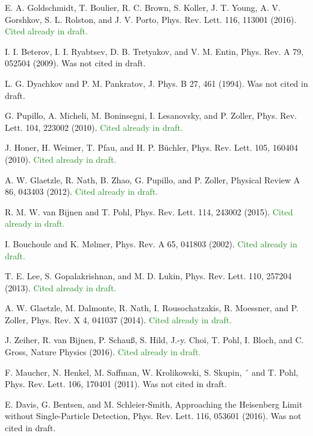 \documentclass[10pt,twocolumn]{article}
\begin{document}
\begin{thebibliography}{8}
E. A. Goldschmidt, T. Boulier, R. C. Brown, S. Koller, J. T. Young, A. V. Gorshkov, S. L. Rolston, and J. V. Porto, Phys. Rev. Lett. 116, 113001 (2016). \textcolor{ForestGreen}{Cited already in draft.}
 
I. I. Beterov, I. I. Ryabtsev, D. B. Tretyakov, and V. M. Entin,
Phys. Rev. A 79, 052504 (2009). \textcolor{RedOrange}{Was not cited in draft.}


L. G. Dyachkov and P. M. Pankratov, J. Phys. B 27, 461
(1994). \textcolor{RedOrange}{Was not cited in draft.}


 G. Pupillo, A. Micheli, M. Boninsegni, I. Lesanovsky, and
P. Zoller, Phys. Rev. Lett. 104, 223002 (2010). \textcolor{ForestGreen}{Cited already in draft.}

 J. Honer, H. Weimer, T. Pfau, and H. P. B\"uchler, Phys. Rev. Lett. 105, 160404 (2010). \textcolor{ForestGreen}{Cited already in draft.}

 A. W. Glaetzle, R. Nath, B. Zhao, G. Pupillo, and P. Zoller, Physical Review A 86, 043403 (2012). \textcolor{ForestGreen}{Cited already in draft.}

 R. M. W. van Bijnen and T. Pohl, Phys. Rev. Lett. 114,
243002 (2015). \textcolor{ForestGreen}{Cited already in draft.}

 I. Bouchoule and K. M{\o}lmer, Phys. Rev. A 65, 041803
(2002). \textcolor{ForestGreen}{Cited already in draft.}

 T. E. Lee, S. Gopalakrishnan, and M. D. Lukin, Phys. Rev.
Lett. 110, 257204 (2013). \textcolor{ForestGreen}{Cited already in draft.}

  A. W. Glaetzle, M. Dalmonte, R. Nath, I. Rousochatzakis,
R. Moessner, and P. Zoller, Phys. Rev. X 4, 041037 (2014). \textcolor{ForestGreen}{Cited already in draft.}

 J. Zeiher, R. van Bijnen, P. Schauß, S. Hild, J.-y. Choi, T. Pohl, I. Bloch, and C. Gross, Nature Physics (2016). \textcolor{ForestGreen}{Cited already in draft.}

 F. Maucher, N. Henkel, M. Saffman, W. Krolikowski, S. Skupin, ´
and T. Pohl, Phys. Rev. Lett. 106, 170401 (2011). \textcolor{RedOrange}{Was not cited in draft.}

 E. Davis, G. Bentsen, and M. Schleier-Smith, Approaching
the Heisenberg Limit without Single-Particle Detection,
Phys. Rev. Lett. 116, 053601 (2016). \textcolor{RedOrange}{Was not cited in draft.}


\end{thebibliography}
\end{document}
